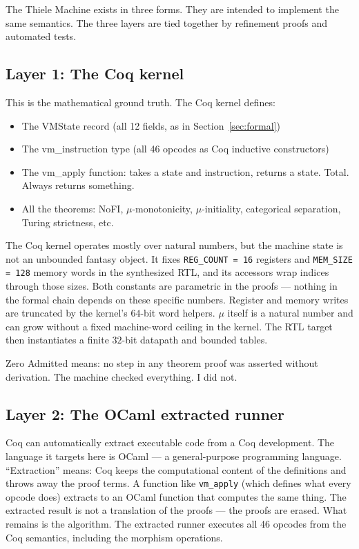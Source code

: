 \documentclass[11pt,a4paper]{article}
\theoremstyle{plain}
\theoremstyle{definition}
\theoremstyle{remark}
\begin{document}
The Thiele Machine exists in three forms. They are intended to implement the same semantics. The three layers are tied together by refinement proofs and automated tests.

\subsection{Layer 1: The Coq kernel}

This is the mathematical ground truth. The Coq kernel defines:
\begin{itemize}
\item The VMState record (all 12 fields, as in Section~\ref{sec:formal})
\item The vm\_instruction type (all 46 opcodes as Coq inductive constructors)
\item The vm\_apply function: takes a state and instruction, returns a state. Total. Always returns something.
\item All the theorems: NoFI, $\mu$-monotonicity, $\mu$-initiality, categorical separation, Turing strictness, etc.
\end{itemize}

The Coq kernel operates mostly over natural numbers, but the machine state is not an unbounded fantasy object. It fixes \texttt{REG\_COUNT = 16} registers and \texttt{MEM\_SIZE = 128} memory words in the synthesized RTL, and its accessors wrap indices through those sizes. Both constants are parametric in the proofs --- nothing in the formal chain depends on these specific numbers. Register and memory writes are truncated by the kernel's $64$-bit word helpers. $\mu$ itself is a natural number and can grow without a fixed machine-word ceiling in the kernel. The RTL target then instantiates a finite $32$-bit datapath and bounded tables.

Zero Admitted means: no step in any theorem proof was asserted without derivation. The machine checked everything. I did not.

\subsection{Layer 2: The OCaml extracted runner}

Coq can automatically extract executable code from a Coq development. The language it targets here is OCaml --- a general-purpose programming language. ``Extraction'' means: Coq keeps the computational content of the definitions and throws away the proof terms. A function like \texttt{vm\_apply} (which defines what every opcode does) extracts to an OCaml function that computes the same thing. The extracted result is not a translation of the proofs --- the proofs are erased. What remains is the algorithm. The extracted runner executes all 46 opcodes from the Coq semantics, including the morphism operations.
\end{document}
